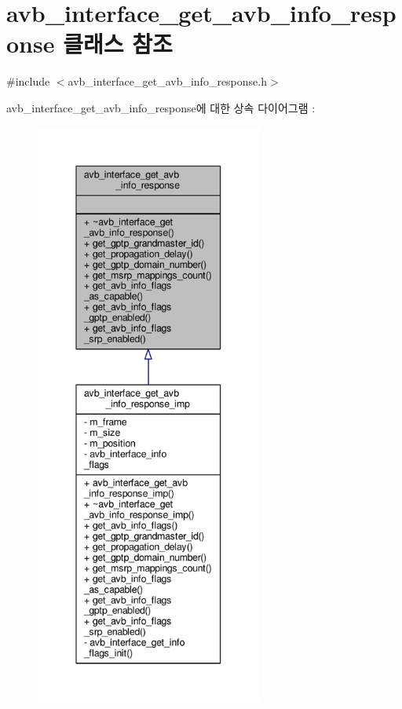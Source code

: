 \hypertarget{classavdecc__lib_1_1avb__interface__get__avb__info__response}{}\section{avb\+\_\+interface\+\_\+get\+\_\+avb\+\_\+info\+\_\+response 클래스 참조}
\label{classavdecc__lib_1_1avb__interface__get__avb__info__response}


{\ttfamily \#include $<$avb\+\_\+interface\+\_\+get\+\_\+avb\+\_\+info\+\_\+response.\+h$>$}



avb\+\_\+interface\+\_\+get\+\_\+avb\+\_\+info\+\_\+response에 대한 상속 다이어그램 \+: 
\nopagebreak
\begin{figure}[H]
\begin{center}
\leavevmode
\includegraphics[height=550pt]{classavdecc__lib_1_1avb__interface__get__avb__info__response__inherit__graph}
\end{center}
\end{figure}


